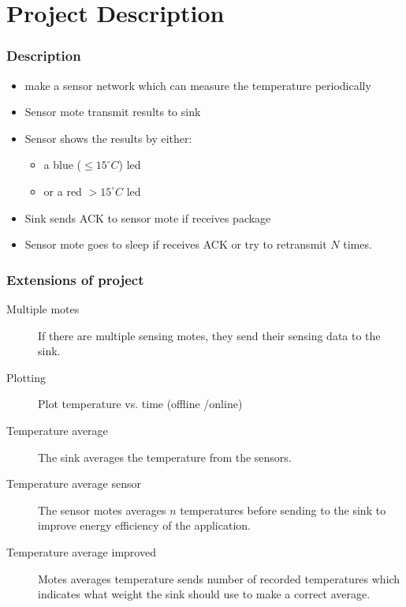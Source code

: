 \section{Project Description}


\begin{frame}
\frametitle{Description}

\begin{itemize}
	\item make a  sensor network which can measure the temperature periodically
	\item Sensor mote transmit results to sink
	\item Sensor shows the results by either:
	\begin{itemize}
		\item a blue ($\leq 15^{\circ} C $) led
		\item or a red $>15^{\circ} C$ led 
	\end{itemize}
	\item Sink sends ACK to sensor mote if receives package
	\item Sensor mote goes to sleep if receives ACK or try to retransmit $N$ times.
\end{itemize}
\end{frame}

\begin{frame}
\frametitle{Extensions of project}
\begin{description}
\item[Multiple motes] If there are multiple sensing motes, they send their sensing data to the sink.
\item[Plotting] Plot temperature vs. time (offline /online)
\item[Temperature average] The sink averages the temperature from the sensors.
\item[Temperature average sensor] The sensor motes averages $n$ temperatures before sending to the sink to improve energy efficiency of the application.
\item[Temperature average improved] Motes averages temperature sends number of recorded temperatures which indicates what weight the sink should use to make a correct average.

\end{description}
\end{frame}

